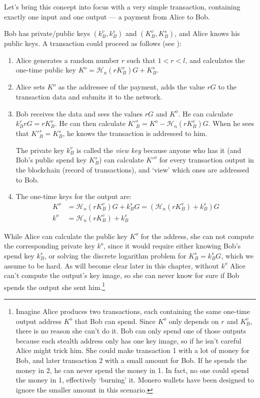 Let’s bring this concept into focus with a very simple transaction, containing exactly one input and one output --- a payment from Alice to Bob.

Bob has private/public keys $(k_B^v, k_B^s)$ and $(K_B^v, K_B^s)$, and Alice knows his public keys. A transaction could proceed as follows (see  \cite{cryptoNoteWhitePaper}):


\begin{enumerate}
	\item Alice generates a random number $r$ such that $1 < r < l$, and calculates the one-time public key $K^o  = \mathcal{H}_n(r K_B^v)G + K_B^s$.

	\item Alice sets $K^o$ as the addressee of the payment, adds the value $r G$ to the transaction data and submits it to the network.
	
	\item 	Bob receives the data and sees the values $r G$ and $K^o$. He can calculate $k_B^v r G = r K_B^v$. He can then calculate $K'^s_B = K^o - \mathcal{H}_n(r K_B^v)G$. When he sees that $K'^s_B = K_B^s$, he knows the transaction is addressed to him.
	
	The private key $k_B^v$ is called the {\em view key} because anyone who has it (and Bob’s public spend key $K_B^s$) can calculate $K'^o$ for every transaction output in the blockchain (record of transactions), and ‘view’ which ones are addressed to Bob.
	
	\item The one-time keys for the output are:
	\begin{align*}
		K^o &= \mathcal{H}_n(r K_B^v)G + k_B^s G = (\mathcal{H}_n(r K_B^v) + k_B^s)G  \\ 
		k^o &= \mathcal{H}_n(r K_B^v) + k_B^s
	\end{align*}
\end{enumerate}

While Alice can calculate the public key $K^o$ for the address, she can not compute the corresponding private key $k^o$, since it would require either knowing Bob’s spend key $k_B^s$, or solving the discrete logarithm problem for $K_B^s = k_B^s G$, which we assume to be hard. As will become clear later in this chapter, without $k^o$ Alice can't compute the output's key image, so she can never know for sure if Bob spends the output she sent him.\footnote{Imagine Alice produces two transactions, each containing the same one-time output address $K^o$ that Bob can spend. Since $K^o$ only depends on $r$ and $K_B^v$, there is no reason she can't do it. Bob can only spend one of those outputs because each stealth address only has one key image, so if he isn't careful Alice might trick him. She could make transaction 1 with a lot of money for Bob, and later transaction 2 with a small amount for Bob. If he spends the money in 2, he can never spend the money in 1. In fact, no one could spend the money in 1, effectively `burning' it. Monero wallets have been designed to ignore the smaller amount in this scenario.}
\\

